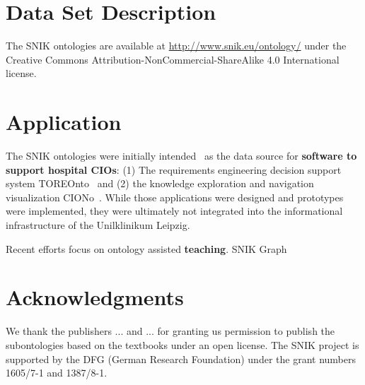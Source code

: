 \documentclass[sw]{iosart2x}
\renewcommand{\citet}{\cite}%
\renewcommand{\citep}{\cite}%
\begin{document}
\section{Data Set Description}\label{sec:dsd}
The SNIK ontologies are available at \url{http://www.snik.eu/ontology/} under the Creative Commons Attribution-NonCommercial-ShareAlike 4.0 International license.

\section{Application}\label{sec:application}
The SNIK ontologies were initially intended~\citep{domaene} as the data source for \textbf{software to support hospital CIOs}:
(1) The requirements engineering decision support system TOREOnto~\citep{toreonto} and (2) the knowledge exploration and navigation visualization CIONo~\citep{ciono}.
While those applications were designed and prototypes were implemented, they were ultimately not integrated into the informational infrastructure of the Unilklinikum Leipzig.

Recent efforts focus on ontology assisted \textbf{teaching}. 
SNIK Graph~\citep{snikgraph}


\section{Acknowledgments}
We thank the publishers ... and ... for granting us permission to publish the subontologies based on the textbooks \citet{bb,ob,he} under an open license.
The SNIK project is supported by the DFG (German Research Foundation) under the grant numbers 1605/7-1 and 1387/8-1.


\end{document}

